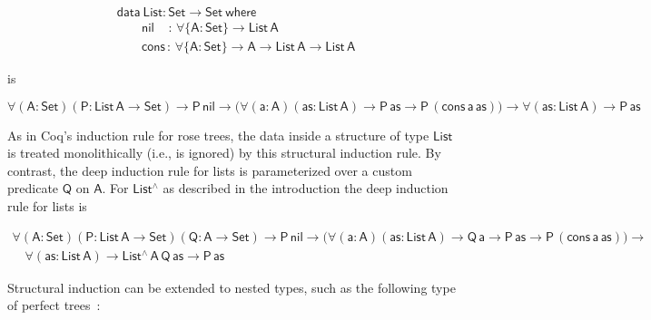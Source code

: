 \documentclass[9pt]{entcs}
\begin{document}
\vspace*{-0.2in}

\begin{equation*}\label{eq:list}
\begin{array}{l}
\mathsf{data\ List : Set \to Set\ where}\\
\mathsf{\;\;\;\;\;\;\;nil\,\,\,\,\,\; :\, \forall \{A : Set\} \to List\,A}\\
\mathsf{\;\;\;\;\;\;\;cons\, :\, \forall \{A : Set\} \to A \to List\,A \to List\,A} 
\end{array}
\end{equation*}

\vspace*{-0.1in}

\noindent
is

\vspace*{-0.3in}

\begin{equation*}
\mathsf{
\forall (A : Set) (P : List\,A \to Set)
\to P\,nil
\to \big( \forall (a : A) (as: List\,A)
\to P\,as
\to P\,(cons\,a\,as)\big)
\to \forall (as : List\,A)
\to P\, as
}
\end{equation*}

\vspace*{-0.1in}

\noindent
As in Coq's induction rule for rose trees, the data inside a structure
of type $\mathsf{List}$ is treated monolithically (i.e., is ignored)
by this structural induction rule.  By contrast, the deep induction
rule for lists is parameterized over a custom predicate $\mathsf{Q}$
on $\mathsf{A}$. For $\mathsf{List^\wedge}$ as described in the
introduction the deep induction rule for lists is

\vspace*{-0.2in}

\[\begin{array}{l}
\mathsf{\forall (A : Set) (P : List\, A \to Set) (Q : A \to Set)
\to P\,nil \to \big( \forall (a : A) (as: List\,A) \to Q\,a \to P\,as
\to P\,(cons\,a\,as)\big) \to} \\ 
\quad\mathsf{\forall (as : List\,A) \to List^{\wedge}\,A\,Q\,as
  \to P\,as } 
\end{array}\]

\vspace*{-0.1in}

Structural induction can be extended to nested types, such as the
following type of perfect trees~\cite{bm98}:
\end{document}
